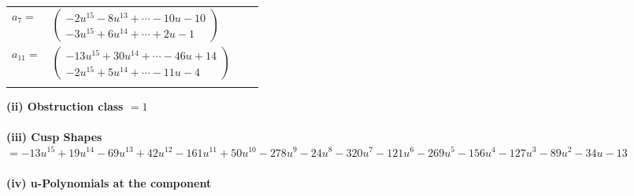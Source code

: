 \documentclass[1p]{elsarticle_modified}
\theoremstyle{definition}
\begin{document}
\begin{tabular}{m{7pt} m{180pt} m{7pt} m{180pt} }
\flushright $a_{7}=$&$\begin{pmatrix}-2 u^{15}-8 u^{13}+\cdots-10 u-10\\-3 u^{15}+6 u^{14}+\cdots+2 u-1\end{pmatrix}$ \\
\flushright $a_{11}=$&$\begin{pmatrix}-13 u^{15}+30 u^{14}+\cdots-46 u+14\\-2 u^{15}+5 u^{14}+\cdots-11 u-4\end{pmatrix}$\\&\end{tabular}
\flushleft \textbf{(ii) Obstruction class $= 1$}\\~\\
\flushleft \textbf{(iii) Cusp Shapes $= -13 u^{15}+19 u^{14}-69 u^{13}+42 u^{12}-161 u^{11}+50 u^{10}-278 u^9-24 u^8-320 u^7-121 u^6-269 u^5-156 u^4-127 u^3-89 u^2-34 u-13$}\\~\\
\newpage\renewcommand{\arraystretch}{1}
\flushleft \textbf{(iv) u-Polynomials at the component}\newline \\
\end{document}
